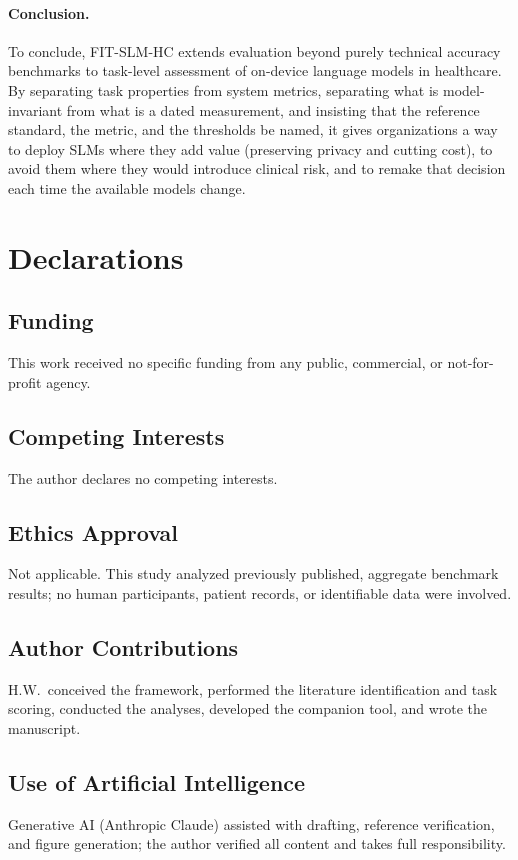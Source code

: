 \documentclass[11pt]{article}
\begin{document}
\paragraph{Conclusion.}
To conclude, FIT-SLM-HC extends evaluation beyond purely technical accuracy benchmarks to task-level assessment of on-device language models in healthcare. By separating task properties from system metrics, separating what is model-invariant from what is a dated measurement, and insisting that the reference standard, the metric, and the thresholds be named, it gives organizations a way to deploy SLMs where they add value (preserving privacy and cutting cost), to avoid them where they would introduce clinical risk, and to remake that decision each time the available models change.

\section*{Declarations}

\subsection*{Funding}
This work received no specific funding from any public, commercial, or not-for-profit agency.

\subsection*{Competing Interests}
The author declares no competing interests.

\subsection*{Ethics Approval}
Not applicable. This study analyzed previously published, aggregate benchmark results; no human participants, patient records, or identifiable data were involved.

\subsection*{Author Contributions}
H.W.\ conceived the framework, performed the literature identification and task scoring, conducted the analyses, developed the companion tool, and wrote the manuscript.

\subsection*{Use of Artificial Intelligence}
Generative AI (Anthropic Claude) assisted with drafting, reference verification, and figure generation; the author verified all content and takes full responsibility.
\end{document}
